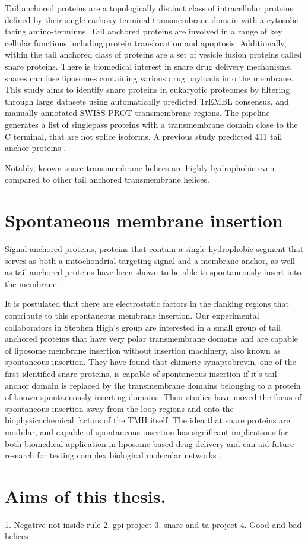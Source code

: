 Tail anchored proteins are a topologically distinct class of intracellular proteins defined by their single carboxy-terminal transmembrane domain with a cytosolic facing amino-terminus. Tail anchored proteins are involved in a range of key cellular functions including protein translocation and apoptosis. Additionally, within the tail anchored class of proteins are a set of vesicle fusion proteins called \gls{snare} proteins. There is biomedical interest in \gls{snare} drug delivery mechanisms. \gls{snare}s can fuse liposomes containing various drug payloads into the membrane. This study aims to identify \gls{snare} proteins in eukaryotic proteomes by filtering through large datasets using automatically predicted TrEMBL consensus, and manually annotated SWISS-PROT transmembrane regions. The pipeline generates a list of singlepass proteins with a transmembrane domain close to the C terminal, that are not splice isoforms. A previous study predicted 411 tail anchor proteins \cite{Kalbfleisch2007}.

Notably, known \gls{snare} transmembrane helices are highly hydrophobic even compared to other tail anchored transmembrane helices.

\section{Spontaneous membrane insertion}
Signal anchored proteins, proteins that contain a single hydrophobic segment that serves as both a mitochondrial targeting signal and a membrane anchor, as well as tail anchored proteins have been shown to be able to spontaneously insert into the membrane \cite{Elisa2012, Lan2000, Colombo2009}.

It is postulated that there are electrostatic factors in the flanking regions that contribute to this spontaneous membrane insertion. Our experimental collaborators in Stephen High’s group are interested in a small group of tail anchored proteins that have very polar transmembrane domains and are capable of liposome membrane insertion without insertion machinery, also known as spontaneous insertion. They have found that chimeric synaptobrevin, one of the first identified \gls{snare} proteins, is capable of spontaneous insertion if it’s tail anchor domain is replaced by the transmembrane domains belonging to a protein of known spontaneously inserting domains. Their studies have moved the focus of spontaneous insertion away from the loop regions and onto the biophysicochemical factors of the TMH itself. The idea that \gls{snare} proteins are modular, and capable of spontaneous insertion has significant implications for both biomedical application in liposome based drug delivery and can aid future research for testing complex biological molecular networks \cite{Allen2013, Nordlund2014}.

\section{Aims of this thesis.}

1. Negative not inside rule
2. \gls{gpi} project
3. \gls{snare} and \gls{ta} project
4. Good and bad helices
